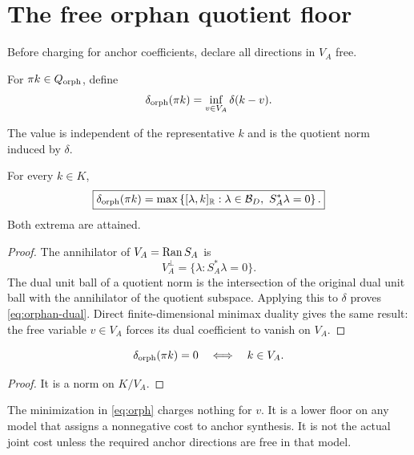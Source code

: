\section{The free orphan quotient floor}
\label{sec:orphan}

Before charging for anchor coefficients, declare all directions in
\(V_A\) free.

\begin{definition}\label{def:orphan-gauge}
For \(\pi k\in Q_{\rm orph}\), define
\begin{equation}\label{eq:orph}
 \delta_{\rm orph}(\pi k)
 =
 \inf_{v\in V_A}\delta(k-v).
\end{equation}
\end{definition}

The value is independent of the representative \(k\) and is the
quotient norm induced by \(\delta\).

\begin{theorem}\label{thm:orphan-dual}
For every \(k\in K\),
\begin{equation}\label{eq:orphan-dual}
 \boxed{\displaystyle
 \delta_{\rm orph}(\pi k)
 =
 \max\left\{
 [\lambda,k]_{\mathbb R}:
 \lambda\in\mathcal B_D,\ S_A^*\lambda=0
 \right\}.}
\end{equation}
Both extrema are attained.
\end{theorem}

\begin{proof}
The annihilator of \(V_A=\operatorname{Ran} S_A\) is
\[
 V_A^\perp=\{\lambda:S_A^*\lambda=0\}.
\]
The dual unit ball of a quotient norm is the intersection of the
original dual unit ball with the annihilator of the quotient
subspace.  Applying this to \(\delta\) proves
\eqref{eq:orphan-dual}.  Direct finite-dimensional minimax duality gives
the same result: the free variable \(v\in V_A\) forces its dual
coefficient to vanish on \(V_A\).
\end{proof}

\begin{corollary}\label{cor:orphan-zero}
\[
 \delta_{\rm orph}(\pi k)=0
 \quad\Longleftrightarrow\quad
 k\in V_A.
\]
\end{corollary}

\begin{proof}
It is a norm on \(K/V_A\).
\end{proof}

\begin{remark}
The minimization in \eqref{eq:orph} charges nothing for \(v\).  It is a
lower floor on any model that assigns a nonnegative cost to anchor
synthesis.  It is not the actual joint cost unless the required anchor
directions are free in that model.
\end{remark}
